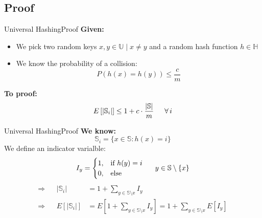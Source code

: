 \subsection{Proof}

\begin{frame}{Universal Hashing}{Proof}
  \textbf{Given:}
  \begin{itemize}
    \item
      We pick two random keys $x, y \in \mathbb{U} \mid x \neq y$ and
      a random hash function $h \in \mathbb{H}$
    \item
      We know the probability of a collision:
      \[P(h(x) = h(y)) \leq \frac{c}{m}\]
  \end{itemize}
  \textbf{To proof:}
  \[E\left[\vert \mathbb{S}_i \vert\right]
     \leq 1 + c \cdot \frac{\vert \mathbb{S} \vert}{m}
     \hspace*{1.5em} \forall \, i\]
\end{frame}


\begin{frame}{Universal Hashing}{Proof}
  \textbf{We know:}
  \[\mathbb{S}_i = \{x \in \mathbb{S}: h(x) = i\}\]
  We define an indicator varialble:
  \begin{displaymath}
    I_y = \begin{cases}
      1, & \text{if } h(y) = i\\
      0, & \text{else}
    \end{cases} \hspace*{1.5em} y \in \mathbb{S} \setminus \{x\}
  \end{displaymath}
  \begin{align*}
    \Rightarrow && \vert \mathbb{S}_i \vert
      & = 1 + \sum_{y \in \mathbb{S} \setminus x} I_y\\
    \Rightarrow && E\left[\vert \mathbb{S}_i \vert\right]
      & = E\left[1 + \sum_{y \in \mathbb{S} \setminus x} I_y\right]
        = 1 + \sum_{y \in \mathbb{S} \setminus x} E[I_y]
  \end{align*}
\end{frame}


